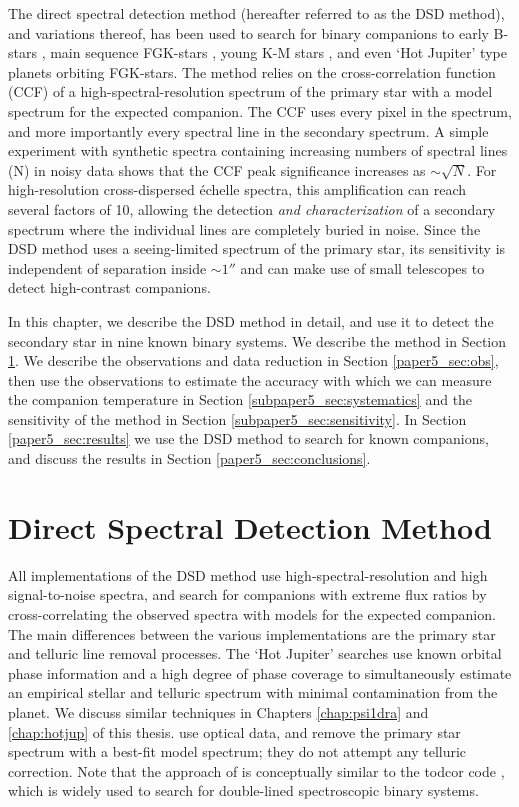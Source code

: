 The direct spectral detection method (hereafter referred to as the DSD method), and variations thereof, has been used to search for binary companions to early B-stars \citep{Gullikson2013}, main sequence FGK-stars \citep{Kolbl2015}, young K-M stars \citep{Prato2002}, and even `Hot Jupiter' type planets \citep{Snellen2010, Brogi2012, deKok2013} orbiting FGK-stars. The method relies on the cross-correlation function (CCF) of a high-spectral-resolution spectrum of the primary star with a model spectrum for the expected companion. The CCF uses every pixel in the spectrum, and more importantly every spectral line in the secondary spectrum. A simple experiment with synthetic spectra containing increasing numbers of spectral lines (N) in noisy data shows that the CCF peak significance increases as $\sim\sqrt{N}$. For high-resolution cross-dispersed \'echelle spectra, this amplification can reach several factors of 10, allowing the detection \emph{and characterization} of a secondary spectrum where the individual lines are completely buried in noise. Since the DSD method uses a seeing-limited spectrum of the primary star, its sensitivity is independent of separation inside $\sim 1 ''$ and can make use of small telescopes to detect high-contrast companions.

In this chapter, we describe the DSD method in detail, and use it to detect the secondary star in nine known binary systems. We describe the method in Section \ref{paper5_sec:method}. We describe the observations and data reduction in Section \ref{paper5_sec:obs}, then use the observations to estimate the accuracy with which we can measure the companion temperature in Section \ref{subpaper5_sec:systematics} and the sensitivity of the method in Section \ref{subpaper5_sec:sensitivity}. In Section \ref{paper5_sec:results} we use the DSD method to search for known companions, and discuss the results in Section \ref{paper5_sec:conclusions}.


\section{Direct Spectral Detection Method}
\label{paper5_sec:method}

All implementations of the DSD method use high-spectral-resolution and high signal-to-noise spectra, and search for companions with extreme flux ratios by cross-correlating the observed spectra with models for the expected companion. The main differences between the various implementations are the primary star and telluric line removal processes. The `Hot Jupiter' searches \citep[e.g.][]{Snellen2010} use known orbital phase information and a high degree of phase coverage to simultaneously estimate an empirical stellar and telluric spectrum with minimal contamination from the planet. We discuss similar techniques in Chapters \ref{chap:psi1dra} and \ref{chap:hotjup} of this thesis. \citet{Kolbl2015} use optical data, and remove the primary star spectrum with a best-fit model spectrum; they do not attempt any telluric correction. Note that the approach of \cite{Kolbl2015} is conceptually similar to the todcor code \citep{Mazeh1994}, which is widely used to search for double-lined spectroscopic binary systems.

